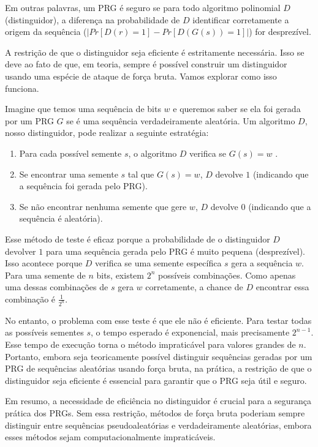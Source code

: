 Em outras palavras, um PRG é seguro se para todo algoritmo polinomial $D$ (distinguidor), a diferença na probabilidade de $D$ identificar corretamente a origem da sequência ($|Pr[D(r) = 1] - Pr[D(G(s)) = 1]|$) for desprezível.

A restrição de que o distinguidor seja eficiente é estritamente necessária.
Isso se deve ao fato de que, em teoria, sempre é possível construir um distinguidor usando uma espécie de ataque de força bruta.
Vamos explorar como isso funciona.

Imagine que temos uma sequência de bits $w$ e queremos saber se ela foi gerada por um PRG $G$  se é uma sequência verdadeiramente aleatória.
Um algoritmo $D$, nosso distinguidor, pode realizar a seguinte estratégia:

\begin{enumerate}
    \item Para cada possível semente $s$, o algoritmo $D$ verifica se $G(s) = w$  . 
    \item Se encontrar uma semente $s$ tal que $G(s) = w$, $D$ devolve $1$ (indicando que a sequência foi gerada pelo PRG).
    \item Se não encontrar nenhuma semente que gere $w$, $D$ devolve $0$ (indicando que a sequência é aleatória).
\end{enumerate}

Esse método de teste é eficaz porque a probabilidade de o distinguidor $D$ devolver $1$ para uma sequência gerada pelo PRG é muito pequena (desprezível).
Isso acontece porque $D$ verifica se uma semente específica $s$ gera a sequência $w$.
Para uma semente de $n$ bits, existem $2^n$ possíveis combinações.
Como apenas uma dessas combinações de $s$ gera $w$ corretamente, a chance de $D$ encontrar essa combinação é $\frac{1}{2^n}$.


No entanto, o problema com esse teste é que ele não é eficiente.
Para testar todas as possíveis sementes $s$, o tempo esperado é exponencial, mais precisamente $2^{n-1}$.
Esse tempo de execução torna o método impraticável para valores grandes de $n$.
Portanto, embora seja teoricamente possível distinguir sequências geradas por um PRG de sequências aleatórias usando força bruta, na prática, a restrição de que o distinguidor seja eficiente é essencial para garantir que o PRG seja útil e seguro.

Em resumo, a necessidade de eficiência no distinguidor é crucial para a segurança prática dos PRGs.
Sem essa restrição, métodos de força bruta poderiam sempre distinguir entre sequências pseudoaleatórias e verdadeiramente aleatórias, embora esses métodos sejam computacionalmente impraticáveis.


